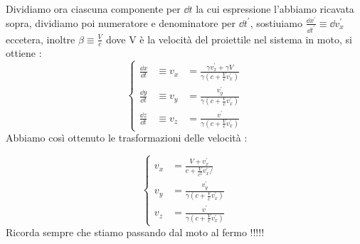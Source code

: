 \documentclass[a4paper, 12pt, twoside]{report}
\begin{document}
Dividiamo ora ciascuna componente per $\dd{t}$ la cui espressione l'abbiamo ricavata sopra, dividiamo poi numeratore e denominatore per $\dd{t^{\prime}}$, sostiuiamo $ \frac{\dd{x^{\prime}}}{\dd{t^{\prime}}} \equiv \dd{v^{\prime}_{x}} $ eccetera, inoltre $\beta \equiv \frac{V}{c}$ 
dove V è la velocità del proiettile nel sistema in moto, si ottiene : 
\newpage
\begin{equation*}
        \left\{ \begin{aligned}
                        \frac{\dd{x}}{\dd{t}} &\equiv v_{x}&= \frac{\gamma v^{\prime}_{x} + \gamma V}{\gamma(c + \frac{V}{c}v^{\prime}_{x})} \\
                        \frac{\dd{y}}{\dd{t}} &\equiv v_{y}&= \frac{v^{\prime}_{y}}{\gamma(c + \frac{V}{c}v^{\prime}_{x})} \\
                        \frac{\dd{z}}{\dd{t}} &\equiv v_{z}&= \frac{v^{\prime}}{\gamma(c + \frac{V}{c}v^{\prime}_{x})}
            \end{aligned}
            \right.
\end{equation*}
Abbiamo così ottenuto le trasformazioni delle velocità : 
\begin{tcolorbox}[colback=red!5!white,colframe=red!50!black,title=ATTENZIONE !]
        \begin{equation*}
                \left\{ \begin{aligned}
                                v_{x} &= \frac{V + v^{\prime}_{x}}{c + \frac{V}{c^{2}}v^{\prime}_{x}/}\\
                                v_{y} &= \frac{v^{\prime}_{y}}{\gamma(c + \frac{V}{c}v^{\prime}_{x})} \\
                                v_{z}&= \frac{v^{\prime}}{\gamma(c + \frac{V}{c}v^{\prime}_{x})}
                        \end{aligned}
                        \right.
        \end{equation*}
        Ricorda sempre che stiamo passando dal moto al fermo !!!!!
\end{tcolorbox}
\newpage
\end{document}
